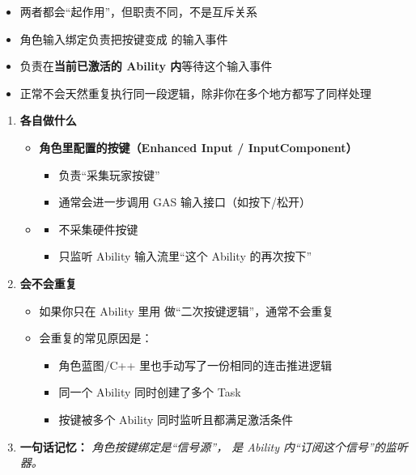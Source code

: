 \begin{itemize}
	\item 两者都会“起作用”，但职责不同，不是互斥关系
	\item 角色输入绑定负责把按键变成  的输入事件
	\item {} 负责在\textbf{当前已激活的 Ability 内}等待这个输入事件
	\item 正常不会天然重复执行同一段逻辑，除非你在多个地方都写了同样处理
\end{itemize}
\begin{enumerate}
	
	\item \textbf{各自做什么}
	\begin{itemize}
		\item \textbf{角色里配置的按键（Enhanced Input / InputComponent）}
		\begin{itemize}
			\item 负责“采集玩家按键”
			\item 通常会进一步调用 GAS 输入接口（如按下/松开）
		\end{itemize}
		
		\item \textbf{}
		\begin{itemize}
			\item 不采集硬件按键
			\item 只监听 Ability 输入流里“这个 Ability 的再次按下”
		\end{itemize}
	\end{itemize}
	
	\item \textbf{会不会重复}
	
	\begin{itemize}
		\item 如果你只在 Ability 里用  做“二次按键逻辑”，通常不会重复
		\item 会重复的常见原因是：
		\begin{itemize}
			\item 角色蓝图/C++ 里也手动写了一份相同的连击推进逻辑
			\item 同一个 Ability 同时创建了多个  Task
			\item 按键被多个 Ability 同时监听且都满足激活条件
		\end{itemize}
	\end{itemize}
	
	\item \textbf{一句话记忆：}
	\emph{角色按键绑定是“信号源”， 是 Ability 内“订阅这个信号”的监听器。}
\end{enumerate}


